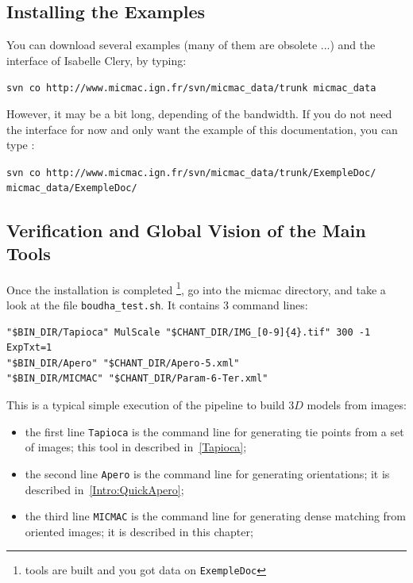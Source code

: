 \subsection{Installing the Examples}

You can download several examples (many of them are obsolete ...) and the interface of
Isabelle Clery, by typing:

{\tt svn co http://www.micmac.ign.fr/svn/micmac\_data/trunk micmac\_data}

However, it may be a bit long, depending of the bandwidth. If you do not need
the interface for now and only want the example of this documentation, you can type :

{\tt svn co http://www.micmac.ign.fr/svn/micmac\_data/trunk/ExempleDoc/ micmac\_data/ExempleDoc/}





\subsection{Verification and Global Vision of the Main Tools}

\label{SHEL:TEST:BOUDHA}

Once the installation is completed \footnote{tools are built and you got data
on {\tt ExempleDoc}}, go into the micmac directory,
and take a look at the file {\tt boudha\_test.sh}. It contains
$3$ command lines:

{\scriptsize
\begin{verbatim}
"$BIN_DIR/Tapioca" MulScale "$CHANT_DIR/IMG_[0-9]{4}.tif" 300 -1 ExpTxt=1
"$BIN_DIR/Apero" "$CHANT_DIR/Apero-5.xml"
"$BIN_DIR/MICMAC" "$CHANT_DIR/Param-6-Ter.xml"
\end{verbatim}
}

This is a typical simple execution of the pipeline to build $3D$ models from images:

\begin{itemize}
    \item the first line {\tt Tapioca} is the command line for generating tie points
          from a set of images; this tool in described in~\ref{Tapioca};

    \item the second line {\tt Apero} is the command line for generating orientations;
           it is described in~\ref{Intro:QuickApero};

    \item the third line {\tt MICMAC} is the command line for generating dense
          matching from oriented images; it is described in this chapter;
\end{itemize}



